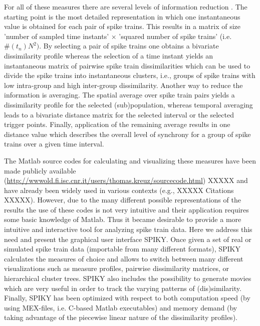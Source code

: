 \documentclass[10pt,twocolumn]{elsart5p}
\begin{document}
For all of these measures there are several levels of information reduction \citep{Kreuz12}. The starting point is the most detailed representation in which one instantaneous value is obtained for each pair of spike trains. This results in a matrix of size ’number of sampled time instants’ × ’squared number of spike trains’ (i.e. $\#(t_n)N^2)$. By selecting a pair of spike trains one obtains a bivariate dissimilarity profile whereas the selection of a time instant yields an instantaneous matrix of pairwise spike train dissimilarities which can be used to divide the spike trains into instantaneous clusters, i.e., groups of spike trains with low intra-group and high inter-group dissimilarity. Another way to reduce the information is averaging. The spatial average over spike train pairs yields a dissimilarity profile for the selected (sub)population, whereas temporal averaging leads to a bivariate distance matrix for the selected interval or the selected trigger points. Finally, application of the remaining average results in one distance value which describes the overall level of synchrony for a group of spike trains over a given time interval.

The Matlab source codes for calculating and visualizing these measures have been made publicly available (\url{http://wwwold.fi.isc.cnr.it/users/thomas.kreuz/sourcecode.html}) XXXXX and have already been widely used in various contexts (e.g., XXXXX Citations XXXXX). However, due to the many different possible representations of the results the use of these codes is not very intuitive and their application requires some basic knowledge of Matlab. Thus it became desirable to provide a more intuitive and interactive tool for analyzing spike train data. Here we address this need and present the graphical user interface SPIKY. Once given a set of real or simulated spike train data (importable from many different formats), SPIKY calculates the measures of choice and allows to switch between many different visualizations such as measure profiles, pairwise dissimilarity matrices, or hierarchical cluster trees. SPIKY also includes the possibility to generate movies which are very useful in order to track the varying patterns of (dis)similarity. Finally, SPIKY has been optimized with respect to both computation speed (by using MEX-files, i.e. C-based Matlab executables) and memory demand (by taking advantage of the piecewise linear nature of the dissimilarity profiles).
\end{document}
